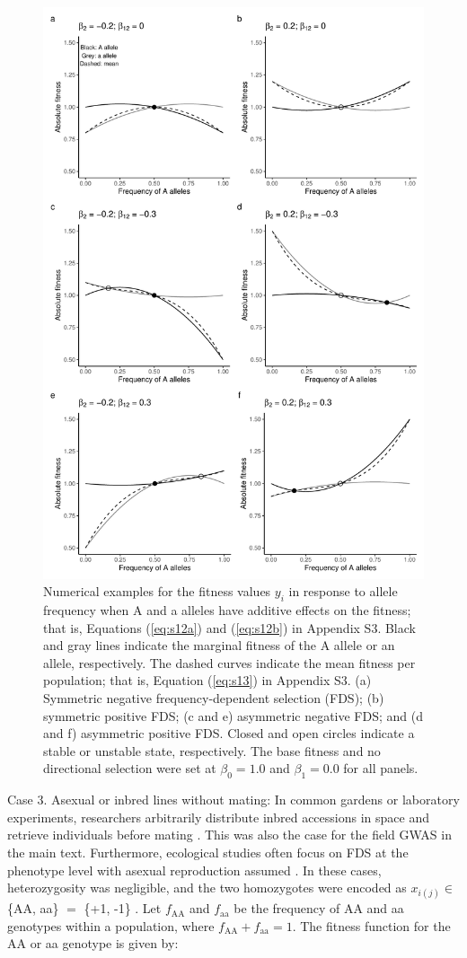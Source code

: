 \documentclass[12pt,]{article}
\begin{document}
\begin{figure}[]
  \includegraphics[width=0.7\linewidth]{AsymFDSadd.pdf}
  \caption{Numerical examples for the fitness values $y_i$ in response to allele frequency when A and a alleles have additive effects on the fitness; that is, Equations (\ref{eq:s12a}) and (\ref{eq:s12b}) in Appendix S3. Black and gray lines indicate the marginal fitness of the A allele or an allele, respectively. The dashed curves indicate the mean fitness per population; that is, Equation (\ref{eq:s13}) in Appendix S3. (a) Symmetric negative frequency-dependent selection (FDS); (b) symmetric positive FDS; (c and e) asymmetric negative FDS; and (d and f) asymmetric positive FDS. Closed and open circles indicate a stable or unstable state, respectively. The base fitness and no directional selection were set at $\beta_0=1.0$ and $\beta_1=0.0$ for all panels.}
  \label{figS2:FDSadd}
\end{figure}

Case 3. Asexual or inbred lines without mating: In common gardens or laboratory experiments, researchers arbitrarily distribute inbred accessions in space and retrieve individuals before mating \citep[e.g.,][]{schutz1969inter, sato2019neighbor}. This was also the case for the field GWAS in the main text. Furthermore, ecological studies often focus on FDS at the phenotype level with asexual reproduction assumed \citep[e.g.,][]{takahashi2018balanced}. In these cases, heterozygosity was negligible, and the two homozygotes were encoded as $x_{i(j)} \in $ \{AA, aa\} $=$ \{+1, -1\} \citep{sato2019neighbor}. Let $f_\mathrm{AA}$ and $f_\mathrm{aa}$ be the frequency of AA and aa genotypes within a population, where $f_\mathrm{AA} + f_\mathrm{aa} = 1$. The fitness function for the AA or aa genotype is given by:
\end{document}

